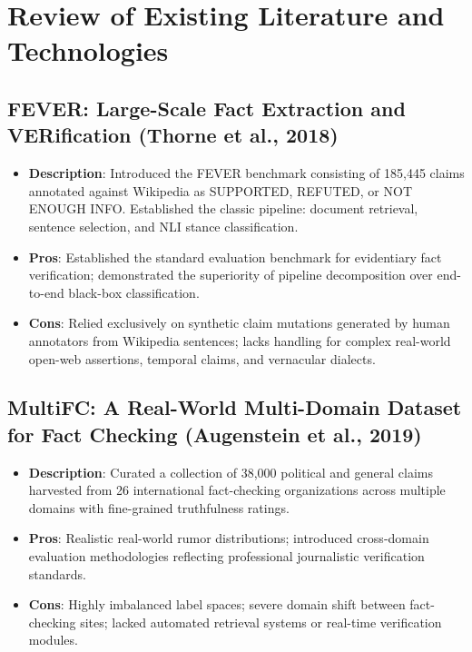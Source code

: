 \documentclass[12pt,a4paper]{report}
\begin{document}
\section{Review of Existing Literature and Technologies}

\subsection{FEVER: Large-Scale Fact Extraction and VERification (Thorne et al., 2018)}
\begin{itemize}
    \item \textbf{Description}: Introduced the FEVER benchmark consisting of 185,445 claims annotated against Wikipedia as SUPPORTED, REFUTED, or NOT ENOUGH INFO. Established the classic pipeline: document retrieval, sentence selection, and NLI stance classification.
    \item \textbf{Pros}: Established the standard evaluation benchmark for evidentiary fact verification; demonstrated the superiority of pipeline decomposition over end-to-end black-box classification.
    \item \textbf{Cons}: Relied exclusively on synthetic claim mutations generated by human annotators from Wikipedia sentences; lacks handling for complex real-world open-web assertions, temporal claims, and vernacular dialects.
\end{itemize}

\subsection{MultiFC: A Real-World Multi-Domain Dataset for Fact Checking (Augenstein et al., 2019)}
\begin{itemize}
    \item \textbf{Description}: Curated a collection of 38,000 political and general claims harvested from 26 international fact-checking organizations across multiple domains with fine-grained truthfulness ratings.
    \item \textbf{Pros}: Realistic real-world rumor distributions; introduced cross-domain evaluation methodologies reflecting professional journalistic verification standards.
    \item \textbf{Cons}: Highly imbalanced label spaces; severe domain shift between fact-checking sites; lacked automated retrieval systems or real-time verification modules.
\end{itemize}
\end{document}
